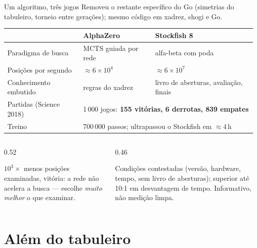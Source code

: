 \documentclass[aspectratio=169, 10pt]{beamer}
\begin{document}
\begin{frame}{Um algoritmo, três jogos}
  \footnotesize
  Removeu o restante específico do Go (simetrias do tabuleiro, torneio entre gerações); mesmo código em xadrez, shogi e Go.

  \medskip
  \centering
  \begin{tabular}{lll}
    \toprule
    & \textbf{AlphaZero} & \textbf{Stockfish 8} \\
    \midrule
    Paradigma de busca      & MCTS guiada por rede & alfa-beta com poda \\
    Posições por segundo    & $\approx 6\times 10^{4}$ & $\approx 6\times 10^{7}$ \\
    Conhecimento embutido   & regras do xadrez & livro de aberturas, avaliação, finais \\
    Partidas (Science 2018) & \multicolumn{2}{l}{1\,000 jogos: \textbf{155 vitórias, 6 derrotas, 839 empates}} \\[-0.1em]
    Treino                  & \multicolumn{2}{l}{700\,000 passos; ultrapassou o Stockfish em $\approx 4$\,h} \\
    \bottomrule
  \end{tabular}

  \smallskip
  \begin{columns}[T]
    \begin{column}{0.52\textwidth}
      \begin{ideiabox}
        $10^3\times$ menos posições examinadas, vitória: a rede não acelera a busca — escolhe \emph{muito melhor} o que examinar.
      \end{ideiabox}
    \end{column}
    \begin{column}{0.46\textwidth}
      \begin{alertabox}
        Condições contestadas (versão, hardware, tempo, sem livro de aberturas); superior até 10:1 em desvantagem de tempo. Informativo, não medição limpa.
      \end{alertabox}
    \end{column}
  \end{columns}
\end{frame}

\section{Além do tabuleiro}
\end{document}
